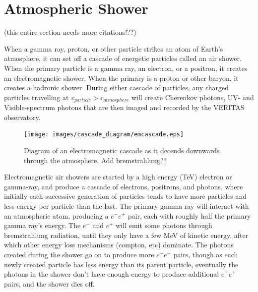 \section{Atmospheric Shower}
  {\color{red}(this entire section needs more citations!??)}

  When a gamma ray, proton, or other particle strikes an atom of Earth's atmosphere, it can set off a cascade of energetic particles called an air shower.
  When the primary particle is a gamma ray, an electron, or a positron, it creates an electromagnetic shower.
  When the primary is a proton or other baryon, it creates a hadronic shower.
  During either cascade of particles, any charged particles travelling at $v_{particle} > c_{atmosphere}$ will create Cherenkov photons, UV- and Visible-spectrum photons that are then imaged and recorded by the VERITAS observatory.

  \begin{figure}[ht]
    \centering
    \texttt{[image: images/cascade\_diagram/emcascade.eps]}
    \caption[Electromagnetic Cascade]{
      Diagram of an electromagnetic cascade as it decends downwards through the atmosphere.
      {\color{red}Add bremstrahlung??}
    }
    \label{fig:emcascade}
  \end{figure}

  Electromagnetic air showers are started by a high energy (\nicetilde TeV) electron or gamma-ray, and produce a cascade of electrons, positrons, and photons, where initially each successive generation of particles tends to have more particles and less energy per particle than the last.
  The primary gamma ray will interact with an atmospheric atom, producing a $e^{-}e^{+}$ pair, each with roughly half the primary gamma ray's energy.
  The $e^{-}$ and $e^{+}$ will emit some photons through bremstrahlung radiation, until they only have a few MeV of kinetic energy, after which other energy loss mechanisms (compton, etc) dominate.
  The photons created during the shower go on to produce more $e^{-}e^{+}$ pairs, though as each newly created particle has less energy than its parent particle, eventually the photons in the shower don't have enough energy to produce additional $e^{-}e^{+}$ pairs, and the shower dies off.

